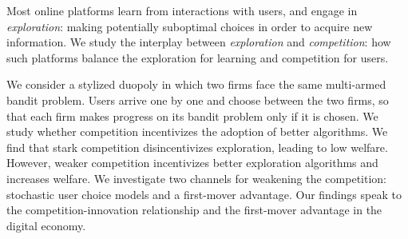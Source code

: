 Most online platforms learn from interactions with users, and engage in \emph{exploration}: making potentially suboptimal choices in order to acquire new information. We study the interplay between \emph{exploration} and \emph{competition}: how such platforms balance the exploration for learning and competition for users.

We consider a stylized duopoly in which two firms face the same multi-armed bandit problem. Users arrive one by one and choose between the two firms, so that each firm makes progress on its bandit problem only if it is chosen. We study whether competition incentivizes the adoption of better algorithms. We find that stark competition disincentivizes exploration, leading to low welfare.
However, weaker competition
incentivizes better exploration algorithms and increases welfare.  We investigate two channels for weakening the competition: stochastic user choice models and a first-mover advantage.
Our findings speak to the competition-innovation relationship and the first-mover advantage in the digital economy.
